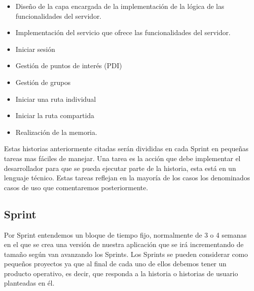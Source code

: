 \begin{itemize}
\item Diseño de la capa encargada de la implementación de la lógica de las funcionalidades del servidor.
\item Implementación del servicio que ofrece las funcionalidades del servidor.
\item Iniciar sesión  
 \item Gestión de puntos de interés (PDI)
  \item Gestión de grupos
  \item Iniciar una ruta individual
   \item Iniciar la ruta compartida
   \item Realización de la memoria.
    
\end{itemize}
 Estas historias anteriormente citadas serán divididas en cada Sprint en pequeñas tareas mas fáciles de manejar. Una tarea es la acción que debe implementar el desarrollador para que se pueda ejecutar parte de la historia, esta está en un lenguaje técnico. Estas tareas reflejan en la mayoría de los casos los denominados casos de uso que comentaremos posteriormente.

\subsection{Sprint}

Por Sprint entendemos un bloque de tiempo fijo, normalmente de 3 o 4 semanas en el que
se crea una versión de nuestra aplicación que se irá incrementando de tamaño
según van avanzando los Sprints. Los Sprints se pueden considerar como pequeños
proyectos ya que al final de cada uno de ellos debemos tener un producto
operativo, es decir, que responda a la historia o historias de usuario planteadas en él.



